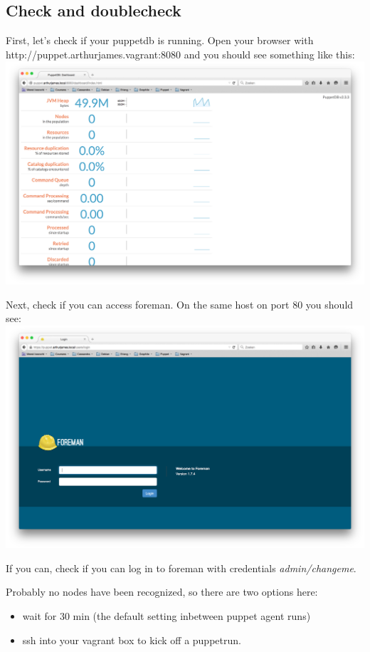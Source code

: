 \documentclass{article}
\begin{document}
\subsection{Check and doublecheck}

\par First, let's check if your puppetdb is running. Open your browser with http://puppet.arthurjames.vagrant:8080 and you should see something like this:\\
\includegraphics[scale=0.3]{images/puppetdb}


\par Next, check if you can access foreman. On the same host on port 80 you should see:\\
\includegraphics[scale=0.3]{images/foreman}

\par If you can, check if you can log in to foreman with credentials \emph{admin/changeme}.
\par Probably no nodes have been recognized, so there are two options here:
\begin{itemize}
\item wait for 30 min (the default setting inbetween puppet agent runs)
\item ssh into your vagrant box to kick off a puppetrun.
\end{itemize} 
\end{document}
